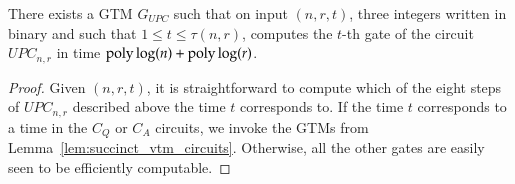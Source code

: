 \begin{lemma}
	There exists a GTM $G_{UPC}$ such that on input $(n,r,t)$, three integers written in binary and such that $1 \leq t \leq \tau(n,r)$, computes the $t$-th gate of the circuit $UPC_{n,r}$ in time $\operatorname{poly}\log(n) + \operatorname{poly} \log(r)$.
\end{lemma}

\begin{proof}
	Given $(n,r,t)$, it is straightforward to compute which of the eight steps of $UPC_{n,r}$ described above the time $t$ corresponds to. If the time $t$ corresponds to a time in the $C_Q$ or $C_A$ circuits, we invoke the GTMs from Lemma~\ref{lem:succinct_vtm_circuits}. Otherwise, all the other gates are easily seen to be efficiently computable. 
	
%	
%	
%	
%	
\end{proof}
